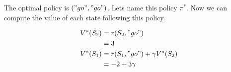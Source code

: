 The optimal policy is $("go","go")$.
Lets name this policy $\pi^*$.
Now we can compute the value of each state following this policy.

\begin{align*}
    V^*(S_2) &= r(S_2, "go") \\
    &= 3 \\
    V^*(S_1) &= r(S_1, "go") + \gamma V^*(S_2) \\
    &= -2 + 3 \gamma
\end{align*}


